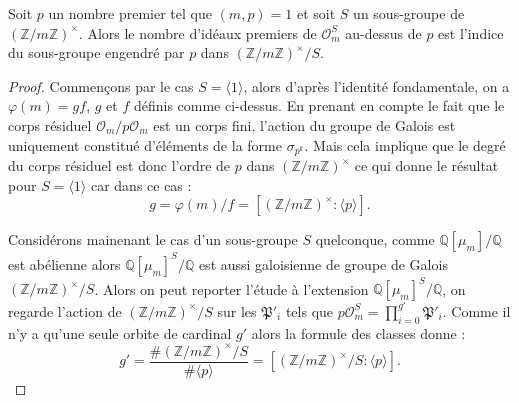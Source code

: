 \documentclass[a4paper]{article} %
\numberwithin{section}{part}
\numberwithin{equation}{section}
\newcommand\zmodninv[1]{(\mathbb{Z}/#1\mathbb{Z})^{\times}}
\newcommand\QQ{\mathbb{Q}}
\newcommand\EO{\mathcal{O}}
\newcommand\groupgen[1]{\langle{#1}\rangle}
\begin{document}
\begin{lem}
\label{lem:nbprimeabove}
Soit $p$ un nombre premier tel que $(m, p) = 1$ et soit $S$ un sous-groupe de
$\zmodninv{m}$. Alors le nombre d'idéaux premiers de $\EO_m^S$ au-dessus de $p$ 
est l'indice du sous-groupe engendré par $p$ dans $\zmodninv{m}/S$.
\end{lem}
\begin{proof}
Commençons par le cas $S = \groupgen{1}$, alors d'après l'identité fondamentale,
on a $\varphi(m) = gf$, $g$ et $f$ définis comme ci-dessus. En prenant en compte
le fait que le corps résiduel $\EO_m/p\EO_m$ est un corps fini, l'action du 
groupe de Galois est uniquement constitué d'éléments de la forme $\sigma_{p^k}$.
Mais cela implique que le degré du corps résiduel est donc l'ordre de $p$ dans 
$\zmodninv{m}$ ce qui donne le résultat pour $S = \groupgen{1}$ car dans ce cas 
:
\begin{equation}
g = \varphi(m)/f = [\zmodninv{m}:\groupgen{p}].
\end{equation}

Considérons mainenant le cas d'un sous-groupe $S$ quelconque, comme 
$\QQ[\mu_m]/\QQ$ est abélienne alors $\QQ[\mu_m]^S/\QQ$ est aussi galoisienne 
de groupe de Galois $\zmodninv{m}/S$. Alors on peut reporter l'étude à 
l'extension $\QQ[\mu_m]^S/\QQ$, on regarde l'action de $\zmodninv{m}/S$ sur les
$\mathfrak{P}'_i$ tels que $p\EO_m^S = \prod_{i=0}^{g'}{\mathfrak{P}'_i}$. Comme
il n'y a qu'une seule orbite de cardinal $g'$ alors la formule des classes
donne :
\begin{equation}
g' = \frac{\#\zmodninv{m}/S}{\#\groupgen{p}} = 
[\zmodninv{m}/S:\groupgen{p}].
\end{equation}
\end{proof}
\end{document}
